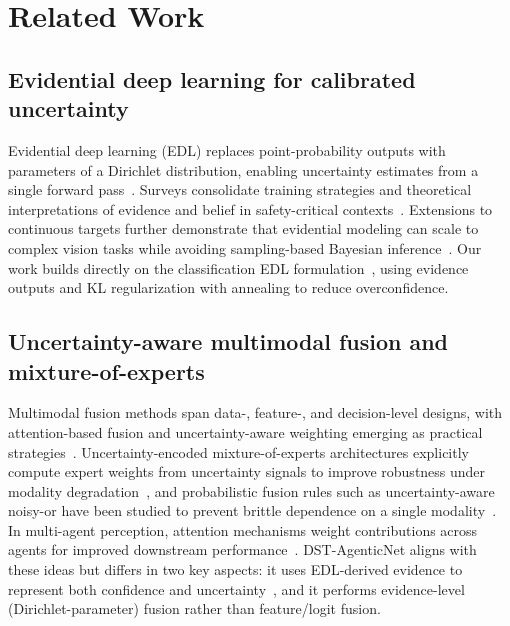 \documentclass[10pt]{article}
\begin{document}
\section{Related Work}
\label{sec:related}

\subsection{Evidential deep learning for calibrated uncertainty}
Evidential deep learning (EDL) replaces point-probability outputs with parameters of a Dirichlet distribution, enabling uncertainty estimates from a single forward pass~\cite{sensoy2018}. Surveys consolidate training strategies and theoretical interpretations of evidence and belief in safety-critical contexts~\cite{gao2024}. Extensions to continuous targets further demonstrate that evidential modeling can scale to complex vision tasks while avoiding sampling-based Bayesian inference~\cite{amini2020}. Our work builds directly on the classification EDL formulation~\cite{sensoy2018}, using evidence outputs and KL regularization with annealing to reduce overconfidence.

\subsection{Uncertainty-aware multimodal fusion and mixture-of-experts}
Multimodal fusion methods span data-, feature-, and decision-level designs, with attention-based fusion and uncertainty-aware weighting emerging as practical strategies~\cite{li2025fusion}. Uncertainty-encoded mixture-of-experts architectures explicitly compute expert weights from uncertainty signals to improve robustness under modality degradation~\cite{lou2023}, and probabilistic fusion rules such as uncertainty-aware noisy-or have been studied to prevent brittle dependence on a single modality~\cite{tian2020}. In multi-agent perception, attention mechanisms weight contributions across agents for improved downstream performance~\cite{ahmed2023}. DST-AgenticNet aligns with these ideas but differs in two key aspects: it uses EDL-derived evidence to represent both confidence and uncertainty~\cite{sensoy2018}, and it performs evidence-level (Dirichlet-parameter) fusion rather than feature/logit fusion.
\end{document}
